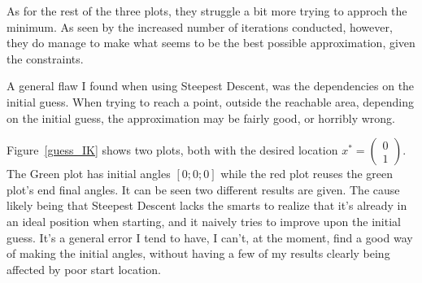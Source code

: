 \documentclass[11pt]{article} %
\begin{document}
As for the rest of the three plots, they struggle a bit more trying to approch the minimum. As seen by the increased number of iterations conducted, however, they do manage to make what seems to be the best possible approximation, given the constraints.

A general flaw I found when using Steepest Descent, was the dependencies on the initial guess. When trying to reach a point, outside the reachable area, depending on the initial guess, the approximation may be fairly good, or horribly wrong.

\begin{figure}[h!]
    \hfill
\caption{}
\label{fig:IK2}
\end{figure}
Figure~\ref{guess_IK} shows two plots, both with the desired location \begin{math}x^*=\begin{pmatrix}0\\1\end{pmatrix}\end{math}. The Green plot has initial angles $[0;0;0]$ while the red plot reuses the green plot's end final angles. It can be seen two different results are given. The cause likely being that Steepest Descent lacks the smarts to realize that it's already in an ideal position when starting, and it naively tries to improve upon the initial guess. It's a general error I tend to have, I can't, at the moment, find a good way of making the initial angles, without having a few of my results clearly being affected by poor start location.
\end{document}
